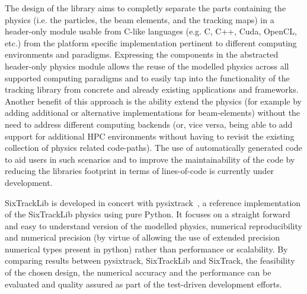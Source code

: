 \documentclass[a4paper,
              ]{jacow}
\begin{document}
The design of the library aims to completly separate the parts containing the physics (i.e. the particles, the beam elements, and the tracking maps) in a header-only module usable from C-like languages (e.g. C, C++, Cuda, OpenCL, etc.) 
from the platform specific implementation pertinent to different computing environments and paradigms. Expressing the components in the abstracted header-only physics module allows the reuse of the modelled physics across all 
supported computing paradigms and to easily tap into the functionality of the tracking library from concrete and already existing applications and frameworks. Another benefit of this approach is the ability extend the physics (for example 
by adding additional or alternative implementations for beam-elements) without the need to address different computing backends (or, vice versa, being able to add support for additional HPC environments without having to revisit the 
existing collection of physics related code-paths). The use of automatically generated code to aid users in such scenarios and to improve the maintainability of the code by reducing the libraries footprint in terms of lines-of-code is currently under development.  

SixTrackLib is developed in concert with pysixtrack~\cite{pysixtrack}, a reference implementation of the SixTrackLib physics using pure Python. It focuses on a straight forward and easy to understand version of the modelled physics, numerical reproducibility and numerical precision (by virtue of allowing the use of extended precision numerical types present in python) rather than performance or scalability. By comparing results between pysixtrack, SixTrackLib and SixTrack, the feasibility of the chosen design, the numerical accuracy and the performance can be evaluated and quality assured as part of the test-driven development efforts.
 
\end{document}
